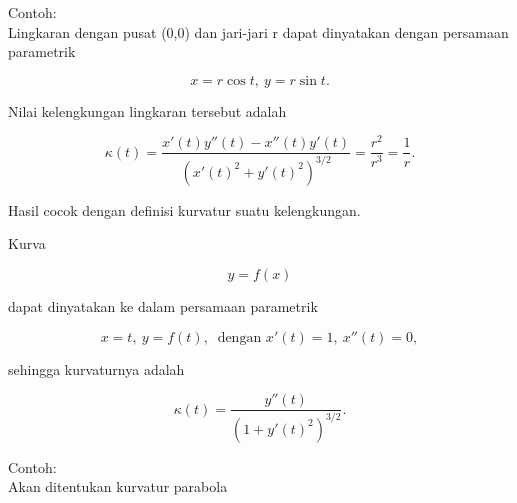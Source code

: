 \documentclass{article}
\newenvironment{eulernotebook}{\par}{\par}
\newenvironment{eulercomment}{\par\medskip}{\par\medskip}
\newenvironment{eulerformula}{}{}
\begin{document}
\begin{eulernotebook}
\begin{eulercomment}
\begin{eulercomment}
\begin{eulercomment}
\begin{eulercomment}
\begin{eulercomment}
Contoh:\\
Lingkaran dengan pusat (0,0) dan jari-jari r dapat dinyatakan dengan
persamaan parametrik

\end{eulercomment}
\begin{eulerformula}
\[
x=r\cos t,\ y=r\sin t.
\]
\end{eulerformula}
\begin{eulercomment}
Nilai kelengkungan lingkaran tersebut adalah

\end{eulercomment}
\begin{eulerformula}
\[
\kappa(t)=\frac{x'(t)y''(t)-x''(t)y'(t)}{\left(x'(t)^2+y'(t)^2\right)^{3/2}}=\frac{r^2}{r^3}=\frac 1 r.
\]
\end{eulerformula}
\begin{eulercomment}
Hasil cocok dengan definisi kurvatur suatu kelengkungan.
\end{eulercomment}
\begin{eulercomment}
Kurva

\end{eulercomment}
\begin{eulerformula}
\[
y=f(x)
\]
\end{eulerformula}
\begin{eulercomment}
dapat dinyatakan ke dalam persamaan parametrik

\end{eulercomment}
\begin{eulerformula}
\[
x=t,\ y=f(t),\ \text{ dengan } x'(t)=1,\ x''(t)=0,
\]
\end{eulerformula}
\begin{eulercomment}
sehingga kurvaturnya adalah

\end{eulercomment}
\begin{eulerformula}
\[
\kappa(t) = \frac{y''(t)}{\left(1+y'(t)^2\right)^{3/2}}.
\]
\end{eulerformula}
\begin{eulercomment}
Contoh:\\
Akan ditentukan kurvatur parabola


\end{eulercomment}
\end{eulercomment}
\end{eulercomment}
\end{eulercomment}
\end{eulercomment}
\end{eulernotebook}
\end{document}

